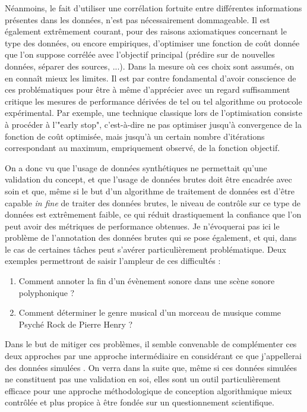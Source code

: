   Néanmoins, le fait d'utiliser une corrélation fortuite entre différentes informations présentes dans les données, n'est pas nécessairement dommageable. Il est également extrêmement courant, pour des raisons axiomatiques concernant le type des données, ou encore empiriques, d'optimiser une fonction de coût donnée que l'on suppose corrélée avec l'objectif principal (prédire sur de nouvelles données, séparer des sources, ...). Dans la mesure où ces choix sont assumés, on en connaît mieux les limites. Il est par contre fondamental d'avoir conscience de ces problématiques pour être à même d'apprécier avec un regard suffisamment critique les mesures de performance dérivées de tel ou tel algorithme ou protocole expérimental\cite{lagrangehal-01635373}. Par exemple, une technique classique lors de l'optimisation consiste à procéder à l'"early stop", c'est-à-dire ne pas optimiser jusqu'à convergence de la fonction de coût optimisée, mais jusqu'à un certain nombre d'itérations correspondant au maximum, empriquement observé, de la fonction objectif.

  On a donc vu que l'usage de données synthétiques ne permettait qu'une validation du concept, et que l'usage de données brutes doit être encadrée avec soin et que, même si le but d'un algorithme de traitement de données est d'être capable \textit{in fine} de traiter des données brutes, le niveau de contrôle sur ce type de données est extrêmement faible, ce qui réduit drastiquement la confiance que l'on peut avoir des métriques de performance obtenues. Je n'évoquerai pas ici le problème de l'annotation des données brutes qui se pose également, et qui, dans le cas de certaines tâches peut s'avérer particulièrement problématique. Deux exemples permettront de saisir l'ampleur de ces difficultés :
  \begin{enumerate}
        \item Comment annoter la fin d'un évènement sonore dans une scène sonore polyphonique ?
    \item  Comment déterminer le genre musical d'un morceau de musique comme \og Psyché Rock \fg de Pierre Henry ?
  \end{enumerate}

  Dans le but de mitiger ces problèmes, il semble convenable de complémenter ces deux approches par une approche intermédiaire en considérant ce que j'appellerai des données \og simulées \fg. On verra dans la suite que, même si ces données simulées ne constituent pas une validation en soi, elles sont un outil particulièrement efficace pour une approche méthodologique de conception algorithmique mieux contrôlée et plus propice à être fondée sur un questionnement scientifique.

